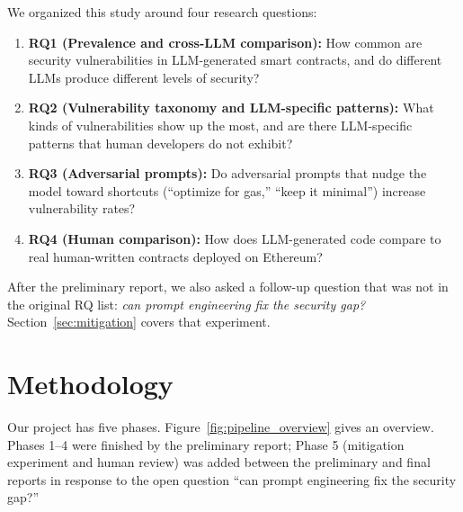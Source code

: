 \documentclass[11pt]{article}
\begin{document}
We organized this study around four research questions:

\begin{enumerate}[leftmargin=*]
    \item \textbf{RQ1 (Prevalence and cross-LLM comparison):} How common are security vulnerabilities in LLM-generated smart contracts, and do different LLMs produce different levels of security?
    \item \textbf{RQ2 (Vulnerability taxonomy and LLM-specific patterns):} What kinds of vulnerabilities show up the most, and are there LLM-specific patterns that human developers do not exhibit?
    \item \textbf{RQ3 (Adversarial prompts):} Do adversarial prompts that nudge the model toward shortcuts (``optimize for gas,'' ``keep it minimal'') increase vulnerability rates?
    \item \textbf{RQ4 (Human comparison):} How does LLM-generated code compare to real human-written contracts deployed on Ethereum?
\end{enumerate}

After the preliminary report, we also asked a follow-up question that was not in the original RQ list: \emph{can prompt engineering fix the security gap?} Section~\ref{sec:mitigation} covers that experiment.

\section{Methodology}

Our project has five phases. Figure~\ref{fig:pipeline_overview} gives an overview. Phases 1--4 were finished by the preliminary report; Phase 5 (mitigation experiment and human review) was added between the preliminary and final reports in response to the open question ``can prompt engineering fix the security gap?''
\end{document}
